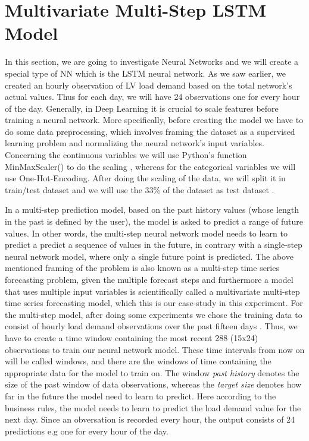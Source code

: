 \section{Multivariate Multi-Step LSTM Model}
In this section, we are going to investigate Neural Networks and we will create a special type of NN which is the LSTM neural network. As we saw earlier, we created an hourly observation of LV load demand based on the total network's actual values. Thus for each day, we will have 24 observations one for every hour of the day. Generally, in Deep Learning it is crucial to scale features before training a neural network. More specifically, before creating the model we have to do some data preprocessing, which involves framing the dataset as a supervised learning problem and normalizing the neural network's input variables. Concerning the continuous variables we will use Python's function MinMaxScaler() to do the scaling \cite{mckinney2012python}, whereas for the categorical variables we will use One-Hot-Encoding. After doing the scaling of the data, we will split it in train/test dataset and we will use the 33\% of the dataset as test dataset \cite{keras}. 
\par In a multi-step prediction model, based on the past history values (whose length in the past is defined by the user), the model is asked to predict a range of future values. 
In other words, the multi-step neural network model needs to learn to predict a predict a sequence of values in the future, in contrary with a single-step neural network model, where only a single future point is predicted. The above mentioned framing of the problem is also known as a multi-step time series forecasting problem, given the multiple forecast steps and furthermore a model that uses multiple input variables is scientifically called a multivariate multi-step time series forecasting model, which this is our case-study in this experiment. For the multi-step model, after doing some experiments we chose the training data to consist of hourly load demand observations over the past fifteen days \cite{kong2017short}. Thus, we have to create a time window containing the most recent 288 (15x24) observations to train our neural network model. These time intervals from now on will be called windows, and there are the windows of time containing the appropriate data for the model to train on. The window \textit{past history} denotes the size of the past window of data observations, whereas the \textit{target size} denotes how far in the future the model need to learn to predict. Here according to the business rules, the model needs to learn to predict the load demand value for the next day. Since an obversation is recorded every hour, the output consists of 24 predictions e.g one for every hour of the day. 
